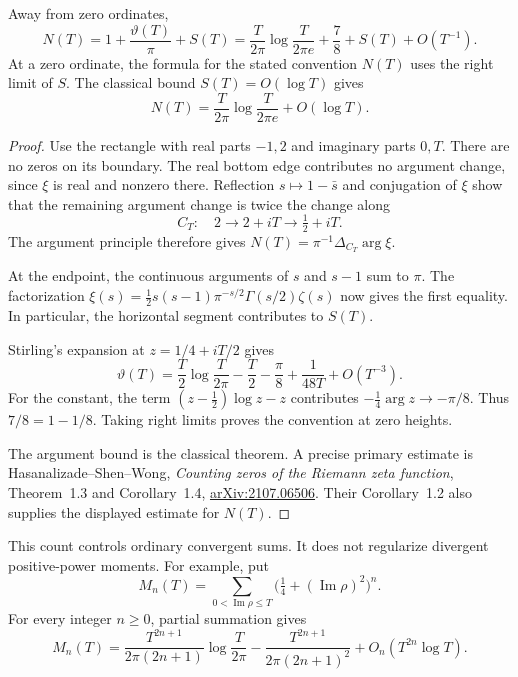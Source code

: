 \begin{proposition}
\label{v4-arith:weil:prop:zero-count}
Away from zero ordinates,
\begin{equation}
 N(T)=1+\frac{\vartheta(T)}\pi+S(T)
 =\frac{T}{2\pi}\log\frac{T}{2\pi e}
       +\frac78+S(T)+O(T^{-1}).
 \label{v4-arith:weil:eq:zero-count}
\end{equation}
At a zero ordinate, the formula for the stated convention \(N(T)\)
uses the right limit of \(S\). The classical bound
\(S(T)=O(\log T)\) gives
\[
 N(T)=\frac{T}{2\pi}\log\frac{T}{2\pi e}+O(\log T).
\]
\end{proposition}
\begin{proof}
Use the rectangle with real parts \(-1,2\) and imaginary parts
\(0,T\). There are no zeros on its boundary. The real bottom edge
contributes no argument change, since \(\xi\) is real and nonzero there.
Reflection \(s\mapsto1-\bar s\) and conjugation of \(\xi\) show that
the remaining argument change is twice the change along
\[
 C_T:\quad 2\longrightarrow2+iT\longrightarrow\tfrac12+iT.
\]
The argument principle therefore gives
\(N(T)=\pi^{-1}\Delta_{C_T}\arg\xi\).

At the endpoint, the continuous arguments of \(s\) and \(s-1\)
sum to \(\pi\). The factorization
\(\xi(s)=\tfrac12s(s-1)\pi^{-s/2}\Gamma(s/2)\zeta(s)\)
now gives the first equality. In particular, the horizontal
segment contributes to \(S(T)\).

Stirling's expansion at \(z=1/4+iT/2\) gives
\[
 \vartheta(T)=\frac T2\log\frac{T}{2\pi}
       -\frac T2-\frac\pi8+\frac1{48T}+O(T^{-3}).
\]
For the constant, the term
\((z-\tfrac12)\log z-z\) contributes
\(-\tfrac14\arg z\to-\pi/8\).
Thus \(7/8=1-1/8\).
Taking right limits proves the convention at zero heights.

The argument bound is the classical theorem. A precise primary
estimate is Hasanalizade--Shen--Wong,
\emph{Counting zeros of the Riemann zeta function},
Theorem~1.3 and Corollary~1.4,
\href{https://arxiv.org/abs/2107.06506}{arXiv:2107.06506}.
Their Corollary~1.2 also supplies the displayed estimate for \(N(T)\).
\end{proof}

This count controls ordinary convergent sums. It does not regularize
divergent positive-power moments.
 For example, put
\[
 M_n(T)=\sum_{0<\operatorname{Im}\rho\le T}
                 \bigl(\tfrac14+(\operatorname{Im}\rho)^2\bigr)^n.
\]
For every integer \(n\ge0\), partial summation gives
\begin{equation}
 M_n(T)=
 \frac{T^{2n+1}}{2\pi(2n+1)}\log\frac{T}{2\pi}
 -\frac{T^{2n+1}}{2\pi(2n+1)^2}
 +O_n(T^{2n}\log T).
 \label{v4-arith:weil:eq:positive-moments}
\end{equation}

